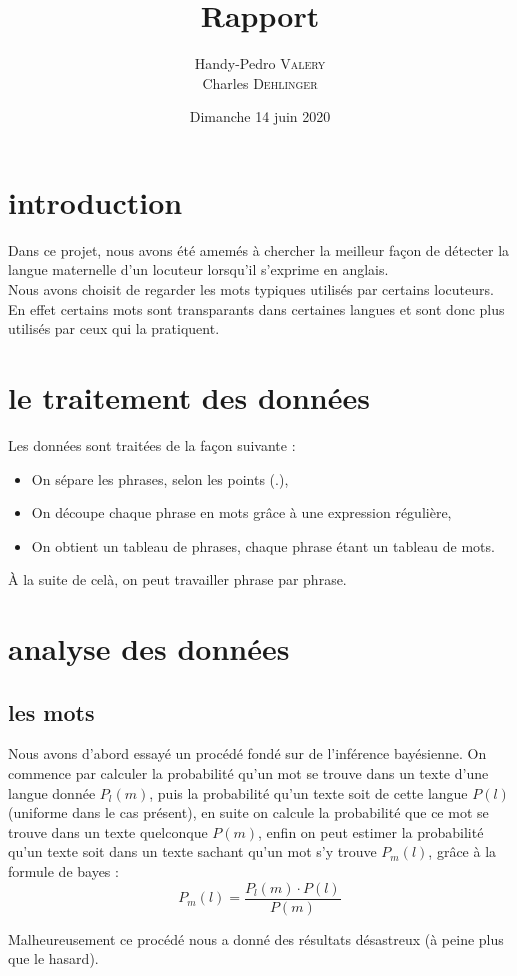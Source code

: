 \documentclass[a4paper]{article}
\title{Rapport}
\author{ Handy-Pedro \textsc{Valery}\\
  Charles \textsc{Dehlinger}\\
}
\date{Dimanche 14 juin 2020}
\begin{document}
\maketitle
\tableofcontents

\section{introduction}
Dans ce projet, nous avons été amemés à chercher la meilleur façon de
détecter la langue maternelle d'un locuteur lorsqu'il s'exprime en
anglais.\\
Nous avons choisit de regarder les mots typiques utilisés par
certains locuteurs. En effet certains mots sont transparants dans
certaines langues et sont donc plus utilisés par ceux qui la
pratiquent.

\section{le traitement des données}
Les données sont traitées de la façon suivante :
\begin{itemize}
\item On sépare les phrases, selon les points (.),
\item On découpe chaque phrase en mots grâce à une expression
  régulière,
\item On obtient un tableau de phrases, chaque phrase étant un tableau
  de mots.
\end{itemize}
À la suite de celà, on peut travailler phrase par phrase.
\section{analyse des données}
\subsection{les mots}
Nous avons d'abord essayé un procédé fondé sur de l'inférence
bayésienne. On commence par calculer la probabilité qu'un mot se
trouve dans un texte d'une langue donnée $P_l(m)$, puis la probabilité
qu'un texte soit de cette langue $P(l)$ (uniforme dans le cas
présent), en suite on calcule la probabilité que ce mot se trouve dans
un texte quelconque $P(m)$, enfin on peut estimer la probabilité qu'un
texte soit dans un texte sachant qu'un mot s'y trouve $P_m(l)$, grâce
à la formule de bayes :
$$P_m(l) = \frac{P_l(m) \cdot P(l)}{P(m)}$$

Malheureusement ce procédé nous a donné des résultats désastreux (à
peine plus que le hasard).
\end{document}
